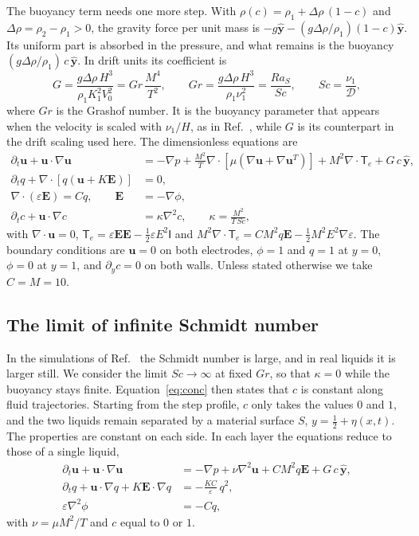 \documentclass[aip,pof,reprint,amsmath,amssymb]{revtex4-2}
\newcommand{\bu}{\bm{u}}
\newcommand{\bE}{\bm{E}}
\begin{document}
The buoyancy term needs one more step. With $\rho(c)=\rho_1+\Delta\rho\,(1-c)$ and
$\Delta\rho=\rho_2-\rho_1>0$, the gravity force per unit mass is
$-g\hat{\bm y}-(g\Delta\rho/\rho_1)(1-c)\hat{\bm y}$. Its uniform part is absorbed in the
pressure, and what remains is the buoyancy $(g\Delta\rho/\rho_1)\,c\,\hat{\bm y}$. In drift
units its coefficient is
\begin{equation}
G=\frac{g\Delta\rho\,H^3}{\rho_1K_1^2V_0^2}=Gr\,\frac{M^4}{T^2},\qquad
Gr=\frac{g\Delta\rho\,H^3}{\rho_1\nu_1^2}=\frac{Ra_S}{Sc},\qquad Sc=\frac{\nu_1}{\mathcal D},
\end{equation}
where $Gr$ is the Grashof number. It is the buoyancy parameter that appears when the
velocity is scaled with $\nu_1/H$, as in Ref.~, while $G$ is its
counterpart in the drift scaling used here. The
dimensionless equations are
\begin{align}
\partial_t\bu+\bu\cdot\nabla\bu&=-\nabla p+\frac{M^2}{T}\nabla\cdot\left[\mu\left(\nabla\bu+
\nabla\bu^T\right)\right]+M^2\nabla\cdot\mathsf T_e+G\,c\,\hat{\bm y},\label{eq:ns}\\
\partial_t q+\nabla\cdot\left[q\left(\bu+K\bE\right)\right]&=0,\label{eq:charge}\\
\nabla\cdot\left(\varepsilon\bE\right)=Cq,\qquad \bE&=-\nabla\phi,\label{eq:poisson}\\
\partial_tc+\bu\cdot\nabla c&=\kappa\nabla^2c,\qquad \kappa=\frac{M^2}{T\,Sc},
\label{eq:conc}
\end{align}
with $\nabla\cdot\bu=0$, $\mathsf T_e=\varepsilon\bE\bE-\tfrac12\varepsilon E^2\mathsf I$ and
$M^2\nabla\cdot\mathsf T_e=CM^2q\bE-\tfrac12M^2E^2\nabla\varepsilon$. The boundary conditions
are $\bu=0$ on both electrodes, $\phi=1$ and $q=1$ at $y=0$, $\phi=0$ at $y=1$, and
$\partial_yc=0$ on both walls. Unless stated otherwise we take $C=M=10$.

\subsection{The limit of infinite Schmidt number}

In the simulations of Ref.~ the Schmidt number is large, and in real
liquids it is larger still. We consider the limit $Sc\to\infty$ at fixed $Gr$, so that
$\kappa=0$ while the buoyancy stays finite. Equation~\eqref{eq:conc} then states that $c$
is constant along fluid trajectories. Starting from the step profile, $c$ only takes the
values $0$ and $1$, and the two liquids remain separated by a material surface $S$,
$y=\tfrac12+\eta(x,t)$. The properties are constant on each side. In each layer the
equations reduce to those of a single liquid,
\begin{align}
\partial_t\bu+\bu\cdot\nabla\bu&=-\nabla p+\nu\nabla^2\bu+CM^2q\bE+G\,c\,\hat{\bm y},
\label{eq:ns_layer}\\
\partial_tq+\bu\cdot\nabla q+K\bE\cdot\nabla q&=-\frac{KC}{\varepsilon}\,q^2,
\label{eq:charge_layer}\\
\varepsilon\nabla^2\phi&=-Cq,\label{eq:poisson_layer}
\end{align}
with $\nu=\mu M^2/T$ and $c$ equal to $0$ or $1$.
\end{document}
